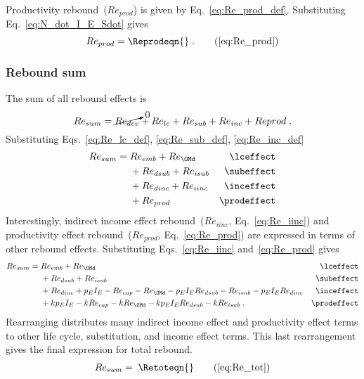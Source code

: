 \subsubsection{\Prodeffect{}} 
\label{sec:Re_prod}

Productivity rebound~($Re_{prod}$) is given by Eq.~\ref{eq:Re_prod_def}.
Substituting Eq.~\ref{eq:N_dot_I_E_Sdot} gives
%
\begin{equation}
  Re_{prod} = \Reprodeqn{} \; . \tag{\ref{eq:Re_prod}}
\end{equation}


\subsubsection{Rebound sum} 
\label{sec:total_rebound}

The sum of all rebound effects is 
%
\begin{equation}
  Re_{sum} = \cancelto{0}{Re_{dev}} + Re_{lc} + Re_{sub} + Re_{inc} + Re{prod} \; .
\end{equation}
%
Substituting Eqs.~\ref{eq:Re_lc_def}, \ref{eq:Re_sub_def}, \ref{eq:Re_inc_def}
%
\begin{align}
  Re_{sum} = \; &Re_{emb} + Re_{\OMd}      & \mathrm{\lceffect}   \nonumber \\
                &+ Re_{dsub} + Re_{isub}   & \mathrm{\subeffect}  \nonumber \\
                &+ Re_{dinc} + Re_{iinc}   & \mathrm{\inceffect}  \nonumber \\
                &+ Re_{prod}               & \mathrm{\prodeffect}
\end{align}
%
Interestingly, 
indirect income effect rebound~($Re_{iinc}$, Eq.~\ref{eq:Re_iinc}) and
productivity effect rebound~($Re_{prod}$, Eq.~\ref{eq:Re_prod})
are expressed in terms of other rebound effects.
Substituting Eqs.~\ref{eq:Re_iinc} and~\ref{eq:Re_prod} gives
%
\begin{align}
  Re_{sum} = \; &Re_{emb} + Re_{\OMd}      & \mathrm{\lceffect}                             \nonumber \\
                &+ Re_{dsub} + Re_{isub}   & \mathrm{\subeffect}                            \nonumber \\
                &+ Re_{dinc} + p_E I_E - Re_{cap} - Re_{\OMd} - p_E I_E Re_{dsub} 
                             - Re_{isub} - p_E I_E Re_{dinc}   & \mathrm{\inceffect}        \nonumber \\
                &+ k p_E I_E - k Re_{cap} - k Re_{\OMd} - k p_E I_E Re_{dsub} - k Re_{isub} \; .  & \mathrm{\prodeffect}
\end{align}
%
Rearranging distributes many indirect income effect and productivity effect terms 
to other life cycle, substitution, and income effect terms.
This last rearrangement gives the final expression for total rebound.
%
\begin{align}
  Re_{sum} = \; \Retoteqn{} \tag{\ref{eq:Re_tot}}
\end{align}

